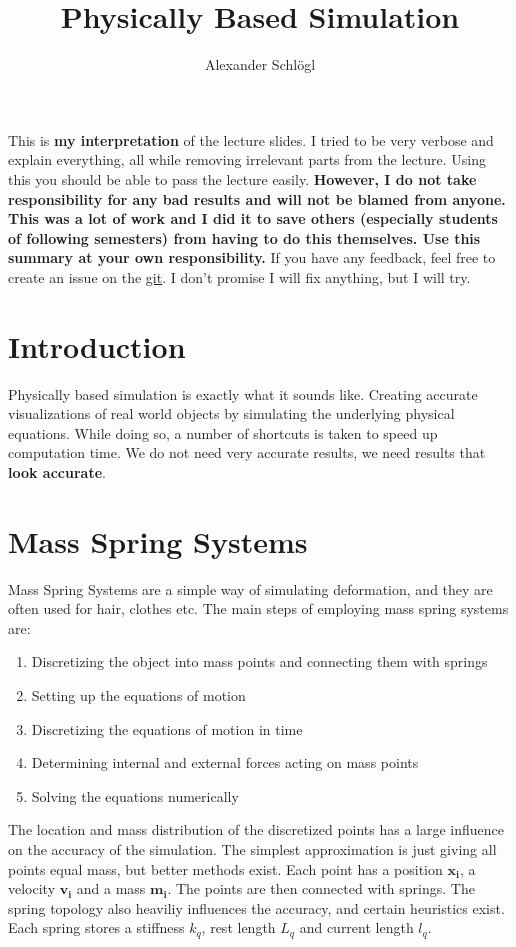 \documentclass{article}
\title{Physically Based Simulation}
\author{Alexander Schlögl}
\begin{document}
\maketitle

\tableofcontents

This is \textbf{my interpretation} of the lecture slides.
I tried to be very verbose and explain everything, all while removing irrelevant parts from the lecture.
Using this you should be able to pass the lecture easily.
\large{\textbf{However, I do not take responsibility for any bad results and will not be blamed from anyone.
This was a lot of work and I did it to save others (especially students of following semesters) from having to do this themselves.
Use this summary at your own responsibility.}}
If you have any feedback, feel free to create an issue on the \href{https://github.com/alxshine/lecture-notes}{git}.
I don't promise I will fix anything, but I will try.
\newpage

\section{Introduction}
Physically based simulation is exactly what it sounds like.
Creating accurate visualizations of real world objects by simulating the underlying physical equations.
While doing so, a number of shortcuts is taken to speed up computation time.
We do not need very accurate results, we need results that \textbf{look accurate}.

\section{Mass Spring Systems}
Mass Spring Systems are a simple way of simulating deformation, and they are often used for hair, clothes etc.
The main steps of employing mass spring systems are:
\begin{enumerate}
    \item Discretizing the object into mass points and connecting them with springs
    \item Setting up the equations of motion
    \item Discretizing the equations of motion in time
    \item Determining internal and external forces acting on mass points
    \item Solving the equations numerically
\end{enumerate}

The location and mass distribution of the discretized points has a large influence on the accuracy of the simulation.
The simplest approximation is just giving all points equal mass, but better methods exist.
Each point has a position $\bm{x_i}$, a velocity $\bm{v_i}$ and a mass $\bm{m_i}$.
The points are then connected with springs.
The spring topology also heaviliy influences the accuracy, and certain heuristics exist.
Each spring stores a stiffness $k_q$, rest length $L_q$ and current length $l_q$.
\end{document}
